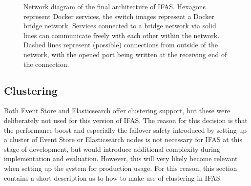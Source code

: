 \begin{figure}[ht]
\caption[Network diagram of the final architecture of \ac{IFAS}.]{
	Network diagram of the final architecture of \ac{IFAS}.
        Hexagons represent Docker services, the switch images represent a Docker bridge network.
        Services connected to a bridge network via solid lines can communicate freely with each other within the network.
        Dashed lines represent (possible) connections from outside of the network, with the opened port being written at the receiving end of the connection.}
        \label{figure:implementation:orchestration:network}
\end{figure}

\subsection{Clustering}
\label{sec:implementation:orchestration:clustering}

Both Event Store and Elasticsearch offer clustering support, but these were deliberately not used for this version of \ac{IFAS}.
The reason for this decision is that the performance boost and especially the failover safety introduced by setting up a cluster of Event Store or Elasticsearch nodes is not necessary for \ac{IFAS} at this stage of development, but would introduce additional complexity during implementation and evaluation.
However, this will very likely become relevant when setting up the system for production usage.
For this reason, this section contains a short description as to how to make use of clustering in \ac{IFAS}.

